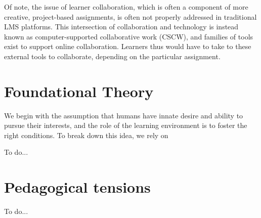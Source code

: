 \documentclass[12pt,twoside,vi]{mitthesis}
\newcommand{\wip}[1]{{\color{red} To do...}}
\begin{document}
Of note, the issue of learner collaboration, which is often a component of more creative, project-based assignments, is often not properly addressed in traditional LMS platforms. This intersection of collaboration and technology is instead known as computer-supported collaborative work (CSCW), and families of tools exist to support online collaboration. Learners thus would have to take to these external tools to collaborate, depending on the particular assignment.

\section{Foundational Theory}

We begin with the assumption that humans have innate desire and ability to pursue their interests, and the role of the learning environment is to foster the right conditions. To break down this idea, we rely on 



\wip{Assuming SDT (autonomy, relevance, competence), which explains why humans have an innate desire to do things and have individualized passions, we use the 4P's to achieve learning outcomes (reason ------ design ----, work collaboratively.... mitch reference)

We had several goals in mind when deciding how to craft the online course, which can be summarized in four principles: 
Projects. 
Peers. 
Passion. 
Play. 
We believe learners do best when they are engaged in th

These principles largely rely on students being drivers of their own learning. 

We turn to self-determination theory (SDT) as a model with which to understand learners’ motivation. SDT [citation needed]

Self-determination theory: autonomy, competence, relatedness. Hence, we prioritize these in designing features of the platform.
}

\section{Pedagogical tensions}

\wip{overall course vs community.........

4 tensions content vs connection, individual pathway vs shared experience, solitary vs team, projects vs puzzles

for each tension, there are benefits to both sides, it's a matter of balancing the two

pedagogy and platform are closely linked but not causully linked

mastery->feedback, community}
\end{document}
